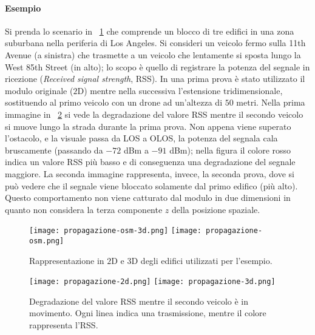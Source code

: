 \paragraph{Esempio} Si prenda lo scenario in \figurename~\ref{fig:propagazione-osm}
che comprende un blocco di tre edifici in una zona suburbana nella periferia di Los Angeles.
Si consideri un veicolo fermo sulla 11th Avenue (a sinistra)
che trasmette a un veicolo che lentamente si sposta lungo la West 85th Street (in alto);
lo scopo è quello di registrare la potenza del segnale in ricezione (\textit{Received signal strength}, RSS).
In una prima prova è stato utilizzato il modulo originale ($2$D) mentre nella successiva
l'estensione tridimensionale, sostituendo al primo veicolo con un drone ad un'altezza di $50$ metri.
Nella prima immagine in \figurename~\ref{fig:propagazione-2d-3d} si vede la degradazione del valore RSS
mentre il secondo veicolo si muove lungo la strada durante la prima prova.
Non appena viene superato l'ostacolo, e la visuale passa da LOS a OLOS, la potenza
del segnala cala bruscamente (passando da $-72$ dBm a $-91$ dBm);
nella figura il colore rosso indica un valore RSS più basso e di conseguenza una degradazione del segnale maggiore.
La seconda immagine rappresenta, invece, la seconda prova, dove si può vedere
che il segnale viene bloccato solamente dal primo edifico (più alto).
Questo comportamento non viene catturato dal modulo in due dimensioni
in quanto non considera la terza componente $z$ della posizione spaziale.
%
\begin{figure}[p]
	\centering
	\texttt{[image: propagazione-osm-3d.png]}
		\hfill
	\texttt{[image: propagazione-osm.png]}
\caption{Rappresentazione in $2$D e $3$D degli edifici utilizzati per l'esempio.\label{fig:propagazione-osm}}
\end{figure}
%
\begin{figure}[p]
	\centering
	\texttt{[image: propagazione-2d.png]}
	\hfill
	\texttt{[image: propagazione-3d.png]}
\caption{Degradazione del valore RSS mentre il secondo veicolo è in movimento.
Ogni linea indica una trasmissione, mentre il colore rappresenta l'RSS.\label{fig:propagazione-2d-3d}}
\end{figure}
%

